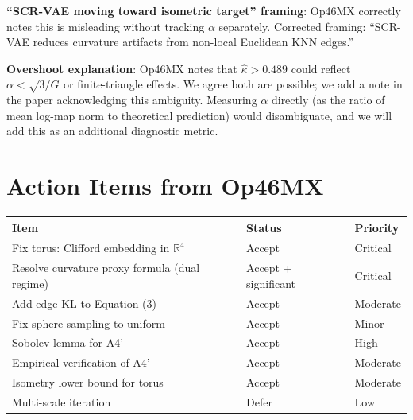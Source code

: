 \documentclass{article}
\begin{document}
\begin{partial}
\textbf{``SCR-VAE moving toward isometric target'' framing}: Op46MX correctly
notes this is misleading without tracking $\alpha$ separately. Corrected framing:
``SCR-VAE reduces curvature artifacts from non-local Euclidean KNN edges.''

\textbf{Overshoot explanation}: Op46MX notes that $\hat{\kappa} > 0.489$ could
reflect $\alpha < \sqrt{3/G}$ or finite-triangle effects. We agree both are
possible; we add a note in the paper acknowledging this ambiguity. Measuring
$\alpha$ directly (as the ratio of mean log-map norm to theoretical prediction)
would disambiguate, and we will add this as an additional diagnostic metric.
\end{partial}

\section{Action Items from Op46MX}

\begin{tabular}{lll}
\hline
Item & Status & Priority \\
\hline
Fix torus: Clifford embedding in $\mathbb{R}^4$ & Accept & Critical \\
Resolve curvature proxy formula (dual regime) & Accept + significant & Critical \\
Add edge KL to Equation (3) & Accept & Moderate \\
Fix sphere sampling to uniform & Accept & Minor \\
Sobolev lemma for A4' & Accept & High \\
Empirical verification of A4' & Accept & Moderate \\
Isometry lower bound for torus & Accept & Moderate \\
Multi-scale iteration & Defer & Low \\
\hline
\end{tabular}
\end{document}

